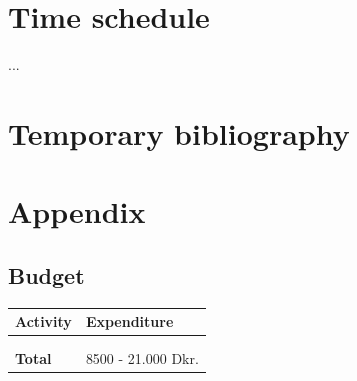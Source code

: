 \documentclass[a4paper]{article}
\begin{document}


\section{Time schedule} 
...

\section{Temporary bibliography}
 


\pagebreak
\section{Appendix}

\subsection{Budget}

\begin{center}
\begin{tabular}{  m{10cm} m{4cm} } 

	\hline
	\textbf{Activity}    & \textbf{Expenditure}\\
	\hline
	    &                               \\
 	    &                               \\
 	\hline
    \textbf{Total}       & 8500 - 21.000 Dkr.			    \\
    \hline

\end{tabular}
\end{center}
\end{document}
